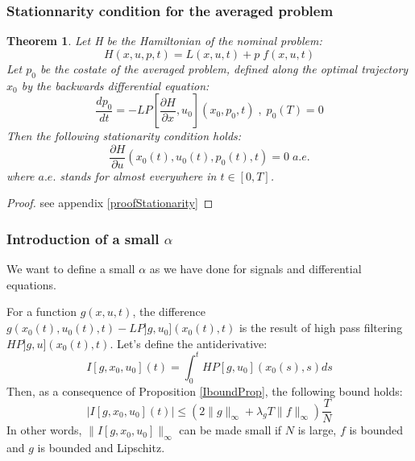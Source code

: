 \documentclass[a4paper,10pt]{article}
\newtheorem{theorem}{Theorem}
\begin{document}
\subsubsection{Stationnarity condition for the averaged problem}
    \begin{theorem}
    Let H be the Hamiltonian of the nominal problem:
    \begin{equation}
        H(x,u,p,t) = L(x,u,t) + p \; f(x,u,t)
        \label{Hamiltonian}
    \end{equation}
    Let $p_{0}$ be the costate of the averaged problem, defined along the 
    optimal trajectory $x_{0}$ by the backwards differential equation:
    \begin{equation}
        \frac{dp_{0}}{dt}=-LP\left[\frac{\partial H}{\partial x},u_{0}\right]
	                              (x_{0},p_{0},t)\; , \; p_{0}(T)=0
        \label{aveCostate}
    \end{equation}
    Then the following stationarity condition holds:
     \begin{equation}
        \frac{\partial H}{\partial u}
	       (x_{0}(t),u_{0}(t),p_{0}(t),t)=0 \; a.e.
        \label{StatCond}
    \end{equation}
    where $a.e.$ stands for almost everywhere in $t \in [0,T]$.
\end{theorem}
\begin{proof}
    see appendix \ref{proofStationarity}
\end{proof}

\subsubsection{Introduction of a small $\alpha$}\label{alphaDefinition}
We want to define a small $\alpha$ as we have done for signals and 
differential equations.

For a function $g(x,u,t)$, the difference 
$g(x_{0}(t),u_{0}(t),t)-LP]g,u_{0}](x_{0}(t),t)$ is the result of high pass 
filtering $HP]g,u](x_{0}(t),t)$. 
Let's define the antiderivative:
\begin{equation}
    I[g,x_{0},u_{0}](t)=\int_{0}^{t}HP[g,u_{0}](x_{0}(s),s)ds
    \label{Icontrol}
\end{equation}
Then, as a consequence of Proposition 
\ref{IboundProp}, the following bound holds:
\begin{equation}
    |I[g,x_{0},u_{0}](t)| \le (2 \|g\|_{\infty} + \lambda_{g}T  \|f\|_{\infty})\frac{T}{N}
    \label{boundIcontrol}
\end{equation}
In other words, $\|I[g,x_{0},u_{0}]\|_{\infty}$ can be made small if $N$ is 
large, $f$ is bounded and $g$ is bounded and Lipschitz.
\end{document}
